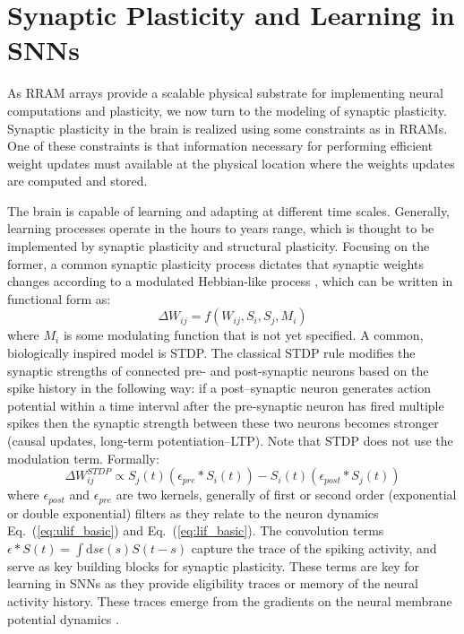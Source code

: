 \documentclass[english]{article}
\renewcommand{\refeq}[1]{{Eq.~(\ref{#1})}}
\renewcommand{\cite}{\citep}
\begin{document}
\section{Synaptic Plasticity and Learning in \acp{SNN}}\label{sec:learning}
As RRAM arrays provide a scalable physical substrate for implementing neural computations and plasticity, we now turn to the modeling of synaptic plasticity. 
Synaptic plasticity in the brain is realized using some constraints as in RRAMs. 
One of these constraints is that information necessary for performing efficient weight updates must available at the physical location where the weights updates are computed and stored.

The brain is capable of learning and adapting at different time scales. Generally, learning processes operate in the hours to years range, which is thought to be implemented by synaptic plasticity and structural plasticity. 
Focusing on the former, a common synaptic plasticity process dictates that synaptic weights changes according to a modulated Hebbian-like process \cite{Gerstner_Kistler02_spikneur}, which can be written in functional form as:
\[
\Delta W_{ij} = f(W_{ij}, S_i, S_j, M_i)
\]
where $M_i$ is some modulating function that is not yet specified. A common, biologically inspired model is \acf{STDP}.
The classical \ac{STDP} rule modifies the synaptic strengths of connected pre- and post-synaptic neurons based on the spike history in the following way:
if a post--synaptic neuron generates action potential within a time interval after the pre-synaptic neuron has fired multiple spikes then the synaptic strength between these two neurons becomes stronger (causal updates, long-term potentiation--LTP). Note that \ac{STDP} does not use the modulation term.
Formally:
\[
\Delta W_{ij}^{STDP} \propto  S_j(t) (\epsilon_{pre} \ast S_i(t)) - S_i(t) (\epsilon_{post} \ast S_j(t)) 
\]
where $\epsilon_{post}$ and $\epsilon_{pre}$ are two kernels, generally of first or second order (exponential or double exponential) filters as they relate to the neuron dynamics \refeq{eq:ulif_basic} and \refeq{eq:lif_basic}.
The convolution terms $\epsilon \ast S(t) = \int \mathrm{d}s \epsilon(s) S(t-s) $ capture the trace of the spiking activity, and serve as key building blocks for synaptic plasticity. 
These terms are key for learning in \acp{SNN} as they provide eligibility traces or memory of the neural activity history.
These traces emerge from the gradients on the neural membrane potential dynamics \cite{Zenke_Ganguli17_supesupe}.
\end{document}
